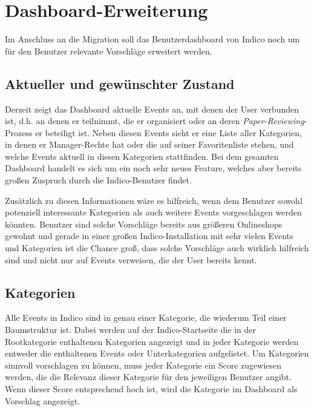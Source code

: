 \chapter{Dashboard-Erweiterung}

Im Anschluss an die Migration soll das Benutzerdashboard von Indico noch um für den Benutzer
relevante Vorschläge erweitert werden.


\section{Aktueller und gewünschter Zustand}

Derzeit zeigt das Dashboard aktuelle Events an, mit denen der User verbunden ist, d.h. an denen er
teilnimmt, die er organisiert oder an deren \emph{Paper-Reviewing}-Prozess er beteiligt ist. Neben
diesen Events sieht er eine Liste aller Kategorien, in denen er Manager-Rechte hat oder die auf
seiner Favoritenliste stehen, und welche Events aktuell in diesen Kategorien stattfinden. Bei dem
gesamten Dashboard handelt es sich um ein noch sehr neues Feature, welches aber bereits großen
Zuspruch durch die Indico-Benutzer findet.

Zusätzlich zu diesen Informationen wäre es hilfreich, wenn dem Benutzer sowohl potenziell
interessante Kategorien als auch weitere Events vorgeschlagen werden könnten. Benutzer sind solche
Vorschläge bereits aus größeren Onlineshops gewohnt und gerade in einer großen Indico-Installation
mit sehr vielen Events und Kategorien ist die Chance groß, dass solche Vorschläge auch wirklich
hilfreich sind und nicht nur auf Events verweisen, die der User bereits kennt.


\section{Kategorien}\label{categorysuggest}

Alle Events in Indico sind in genau einer Kategorie, die wiederum Teil einer Baumstruktur ist. Dabei
werden auf der Indico-Startseite die in der Rootkategorie enthaltenen Kategorien angezeigt und in
jeder Kategorie werden entweder die enthaltenen Events oder Unterkategorien aufgelistet. Um
Kategorien sinnvoll vorschlagen zu können, muss jeder Kategorie ein Score zugewiesen werden, die die
Relevanz dieser Kategorie für den jeweiligen Benutzer angibt. Wenn dieser Score entsprechend hoch
ist, wird die Kategorie im Dashboard als Vorschlag angezeigt.

